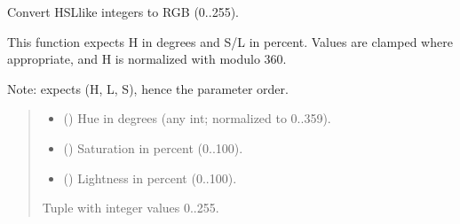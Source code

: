 \documentclass[letterpaper,10pt,english]{sphinxmanual}
\begin{document}

\begin{fulllineitems}
\label{\detokenize{api/colors:colors.hsl_to_rgb}}
\pysigstartsignatures
\pysiglinewithargsret
{}
{\sphinxparamcomma {}\sphinxparamcomma {}}
{}
\pysigstopsignatures
\sphinxAtStartPar
Convert HSL\sphinxhyphen{}like integers to RGB (0..255).

\sphinxAtStartPar
This function expects H in degrees and S/L in percent. Values are clamped
where appropriate, and H is normalized with modulo 360.

\sphinxAtStartPar
Note:  expects (H, L, S), hence the parameter order.
\begin{quote}\begin{description}
\begin{itemize}
\item {} 
\sphinxAtStartPar
{} () \textendash{} Hue in degrees (any int; normalized to 0..359).

\item {} 
\sphinxAtStartPar
{} () \textendash{} Saturation in percent (0..100).

\item {} 
\sphinxAtStartPar
{} () \textendash{} Lightness in percent (0..100).

\end{itemize}

\sphinxAtStartPar
{}

\sphinxAtStartPar
Tuple  with integer values 0..255.

\end{description}\end{quote}

\end{fulllineitems}
\end{document}
